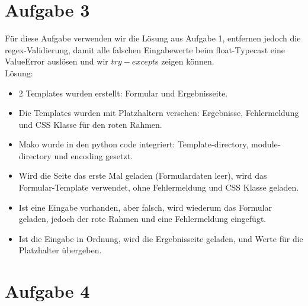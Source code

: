 \documentclass[12pt, a4paper]{report}
\begin{document}
\section*{Aufgabe 3}
Für diese Aufgabe verwenden wir die Lösung aus Aufgabe 1, entfernen jedoch die regex-Validierung, damit alle falschen Eingabewerte beim float-Typecast eine ValueError auslösen und wir $try-except$s zeigen können.\\
Lösung:
\begin{itemize}
	\item 2 Templates wurden erstellt: Formular und Ergebnisseite.
	\item Die Templates wurden mit Platzhaltern versehen: Ergebnisse, Fehlermeldung und CSS Klasse für den roten Rahmen.
	\item Mako wurde in den python code integriert: Template-directory, module-directory und encoding gesetzt.
	\item Wird die Seite das erste Mal geladen (Formulardaten leer), wird das Formular-Template verwendet, ohne Fehlermeldung und CSS Klasse geladen.
	\item Ist eine Eingabe vorhanden, aber falsch, wird wiederum das Formular geladen, jedoch der rote Rahmen und eine Fehlermeldung eingefügt.
	\item Ist die Eingabe in Ordnung, wird die Ergebnisseite geladen, und Werte für die Platzhalter übergeben.
\end{itemize}



\section*{Aufgabe 4}
\end{document}
